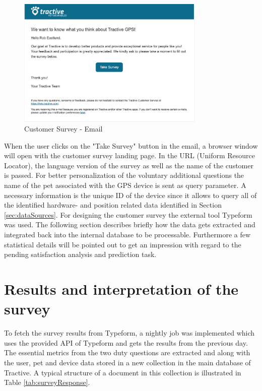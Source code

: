 \begin{figure}
	\centering
	\includegraphics[width=0.8\textwidth]{img/customerSurveyEmail.png}
	\caption{Customer Survey - Email}
	\label{fig:customerSurveyEmail}
\end{figure} 

When the user clicks on the "Take Survey" button in the email, a browser window will open with the customer survey landing page. In the URL (Uniform Resource Locator), the language version of the survey as well as the name of the customer is passed. For better personalization of the voluntary additional questions the name of the pet associated with the GPS device is sent as query parameter. A necessary information is the unique ID of the device since it allows to query all of the identified hardware- and position related data identified in Section \ref{sec:dataSources}. For designing the customer survey the external tool Typeform was used. The following section describes briefly how the data gets extracted and integrated back into the internal database to be processable. Furthermore a few statistical details will be pointed out to get an impression with regard to the pending satisfaction analysis and prediction task.

\section{Results and interpretation of the survey}
\label{sec:surveyResults}
To fetch the survey results from Typeform, a nightly job was implemented which uses the provided API of Typeform and gets the results from the previous day. The essential metrics from the two duty questions are extracted and along with the user, pet and device data stored in a new collection in the main database of Tractive. A typical structure of a document in this collection is illustrated in Table \ref{tab:surveyResponse}.

